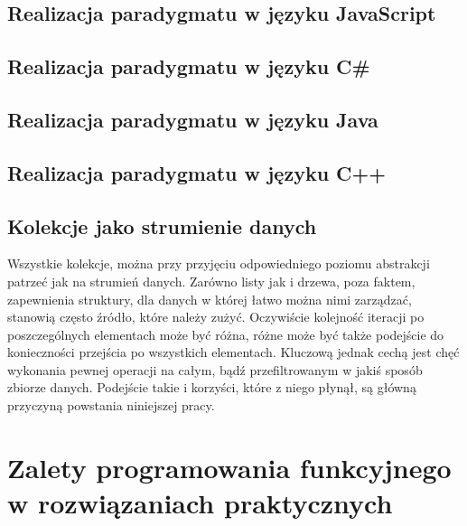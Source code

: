 \documentclass[a4paper,10pt]{report}
\begin{document}
\section{Realizacja paradygmatu w języku JavaScript}
\section{Realizacja paradygmatu w języku C\#}
\section{Realizacja paradygmatu w języku Java}
\section{Realizacja paradygmatu w języku C++}
\section{Kolekcje jako strumienie danych}
Wszystkie kolekcje, można przy przyjęciu odpowiedniego poziomu abstrakcji patrzeć jak na strumień danych. Zarówno listy jak i drzewa, poza faktem, zapewnienia struktury, dla danych w której łatwo można nimi zarządzać, stanowią często źródło, które należy zużyć. Oczywiście kolejność iteracji po poszczególnych elementach może być różna, różne może być także podejście do konieczności przejścia po wszystkich elementach. Kluczową jednak cechą jest chęć wykonania pewnej operacji na całym, bądź przefiltrowanym w jakiś sposób zbiorze danych. Podejście takie i korzyści, które z niego płynął, są główną przyczyną powstania niniejszej pracy.
\chapter{Zalety programowania funkcyjnego w rozwiązaniach praktycznych}
\end{document}
